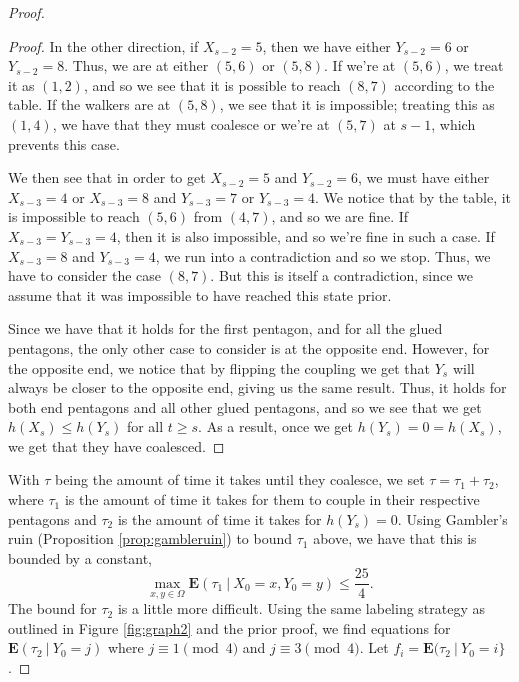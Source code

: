 \documentclass[10pt,a4paper]{amsart}
\theoremstyle{definition}
\numberwithin{definition}{section}
\begin{document}
\begin{proof}
\begin{proof}
In the other direction, if $X_{s-2} = 5$, then we have either $Y_{s-2} = 6$ or $Y_{s-2} = 8$. Thus, we are at either $(5,6)$ or $(5,8)$. If we're at $(5,6)$, we treat it as $(1,2)$, and so we see that it is possible to reach $(8,7)$ according to the table. If the walkers are at $(5,8)$, we see that it is impossible; treating this as $(1,4)$, we have that they must coalesce or we're at $(5,7)$ at $s-1$, which prevents this case.

We then see that in order to get $X_{s-2} = 5$ and $Y_{s-2} = 6$, we must have either $X_{s-3} = 4$ or $X_{s-3} = 8$ and $Y_{s-3} = 7$ or $Y_{s-3} = 4$. We notice that by the table, it is impossible to reach $(5,6)$ from $(4,7)$, and so we are fine. If $X_{s-3} = Y_{s-3} = 4$, then it is also impossible, and so we're fine in such a case. If $X_{s-3} = 8$ and $Y_{s-3} = 4$, we run into a contradiction and so we stop. Thus, we have to consider the case $(8,7)$. But this is itself a contradiction, since we assume that it was impossible to have reached this state prior.

Since we have that it holds for the first pentagon, and for all the glued pentagons, the only other case to consider is at the opposite end. However, for the opposite end, we notice that by flipping the coupling we get that $Y_s$ will always be closer to the opposite end, giving us the same result. Thus, it holds for both end pentagons and all other glued pentagons, and so we see that we get $h(X_s) \leq h(Y_s)$ for all $t \geq s$. As a result, once we get $h(Y_s) = 0 = h(X_s)$, we get that they have coalesced.

\end{proof}

With $\tau$ being the amount of time it takes until they coalesce, we set $\tau = \tau_1 + \tau_2$, where $\tau_1$ is the amount of time it takes for them to couple in their respective pentagons and $\tau_2$ is the amount of time it takes for $h(Y_s) = 0$. Using Gambler's ruin (Proposition \ref{prop:gambleruin}) to bound $\tau_1$ above, we have that this is bounded by a constant,
\[ \max_{x,y \in \Omega} \mathbf{E}(\tau_1 \ | \ X_0 = x, Y_0 =y) \leq \frac{25}{4}.\]
The bound for $\tau_2$ is a little more difficult. Using the same labeling strategy as outlined in Figure \ref{fig:graph2} and the prior proof, we find equations for $\mathbf{E}(\tau_2 \ | \ Y_0 = j)$ where $j \equiv 1 \pmod{4}$ and $j \equiv 3 \pmod{4}$. Let $f_i = \mathbf{E}(\tau_2 \ | \ Y_0 = i\}$.


\end{proof}
\end{document}
